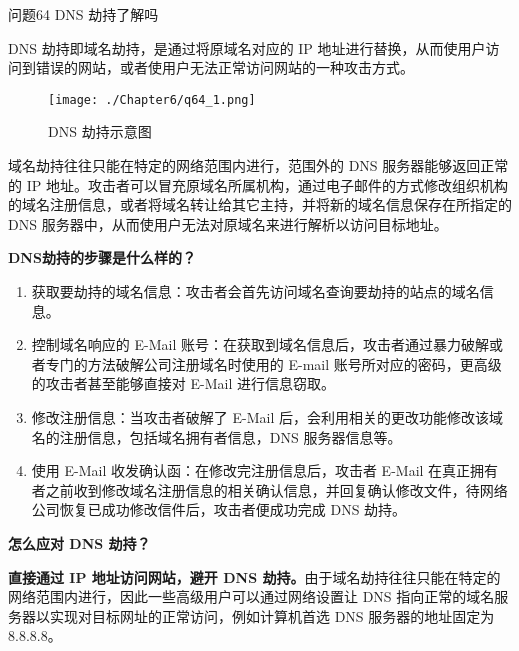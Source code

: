 \documentclass[cn,11pt,color=blue,lang=cn]{elegantbook}
\begin{document}
\begin{custom}{问题64}
DNS 劫持了解吗
\end{custom}
\begin{solution}
DNS 劫持即域名劫持，是通过将原域名对应的 IP 地址进行替换，从而使用户访问到错误的网站，或者使用户无法正常访问网站的一种攻击方式。

\begin{figure}[!h]
\centering
\texttt{[image: ./Chapter6/q64\_1.png]}
\caption{DNS 劫持示意图}
\label{fig64_1}
\end{figure}

域名劫持往往只能在特定的网络范围内进行，范围外的 DNS 服务器能够返回正常的 IP 地址。攻击者可以冒充原域名所属机构，通过电子邮件的方式修改组织机构的域名注册信息，或者将域名转让给其它主持，并将新的域名信息保存在所指定的 DNS 服务器中，从而使用户无法对原域名来进行解析以访问目标地址。

\begin{note} \textbf{DNS劫持的步骤是什么样的？} \end{note}
\begin{enumerate}
	\item 获取要劫持的域名信息：攻击者会首先访问域名查询要劫持的站点的域名信息。
	\item 控制域名响应的 E-Mail 账号：在获取到域名信息后，攻击者通过暴力破解或者专门的方法破解公司注册域名时使用的 E-mail 账号所对应的密码，更高级的攻击者甚至能够直接对 E-Mail 进行信息窃取。
	\item 修改注册信息：当攻击者破解了 E-Mail 后，会利用相关的更改功能修改该域名的注册信息，包括域名拥有者信息，DNS 服务器信息等。
	\item 使用 E-Mail 收发确认函：在修改完注册信息后，攻击者 E-Mail 在真正拥有者之前收到修改域名注册信息的相关确认信息，并回复确认修改文件，待网络公司恢复已成功修改信件后，攻击者便成功完成 DNS 劫持。
\end{enumerate}

\begin{note} \textbf{怎么应对 DNS 劫持？} \end{note}
\textbf{直接通过 IP 地址访问网站，避开 DNS 劫持。}由于域名劫持往往只能在特定的网络范围内进行，因此一些高级用户可以通过网络设置让 DNS 指向正常的域名服务器以实现对目标网址的正常访问，例如计算机首选 DNS 服务器的地址固定为 8.8.8.8。

\end{solution}
\end{document}
